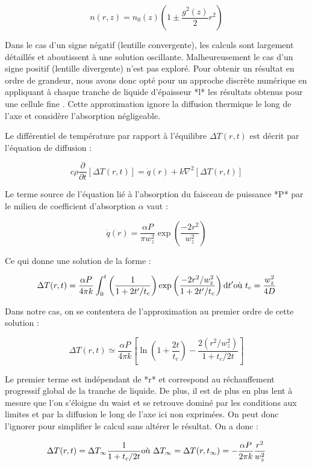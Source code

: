 $$
n(r,z) = n_0(z) \left( 1 \pm \frac{g^2(z)}{2}r^2\right)
$$

Dans le cas d'un signe négatif (lentille convergente), les calculs sont largement détaillés et aboutissent à une solution oscillante. Malheureusement le cas d'un signe positif (lentille divergente) n'est pas exploré. Pour obtenir un résultat en ordre de grandeur, nous avons donc opté pour un approche discrète numérique en appliquant à chaque tranche de liquide d'épaisseur *l* les résultats obtenus pour une cellule fine \cite{gordon_longtransient_1965}\cite{whinnery_laser_1974}. Cette approximation ignore la diffusion thermique le long de l'axe et considère l'absorption négligeable.

Le différentiel de température par rapport à l'équilibre $\Delta T(r,t)$ est décrit par l'équation de diffusion :

$$
c\rho\frac{\partial}{\partial t}[\Delta T(r,t)] = \dot{q}(r) + k \nabla^2[\Delta T(r,t)]
$$

Le terme source de l'équation lié à l'absorption du faisceau de puissance *P* par le milieu de coefficient d'absorption $\alpha$ vaut :

$$
\dot{q}(r) = \frac{\alpha P}{\pi w^2_z}\exp \left(\frac{-2r^2}{w^2_z} \right)
$$

Ce qui donne une solution de la forme :

$$
\Delta T(r,t) = \frac{\alpha P}{4\pi k} \int_0^t \left( \frac{1}{1+2t'/t_c} \right) \exp \left( \frac{-2r^2/w_z^2}{1+2t'/t_c} \right) \mathrm{d}t'
\\
\text{où} \ t_c = \frac{w_z^2}{4D}
$$

Dans notre cas, on se contentera de l'approximation au premier ordre de cette solution :

$$
\Delta T(r,t) \simeq \frac{\alpha P}{4\pi k} \left[ \ln\left( 1+\frac{2t}{t_c} \right) - \frac{2(r^2/w_z^2)}{1+t_c/2t} \right]
$$

Le premier terme est indépendant de *r* et correspond au réchauffement progressif global de la tranche de liquide. De plus, il est de plus en plus lent à mesure que l'on s'éloigne du waist et se retrouve dominé par les conditions aux limites et par la diffusion le long de l'axe ici non exprimées. On peut donc l'ignorer pour simplifier le calcul sans altérer le résultat. On a donc :

$$
\Delta T(r,t) = \Delta T_\infty \frac{1}{1+t_c/2t}
\\
\text{où} \ \Delta T_\infty = \Delta T(r,t_\infty) = -\frac{\alpha P}{2\pi k}\frac{r^2}{w_z^2}
$$


